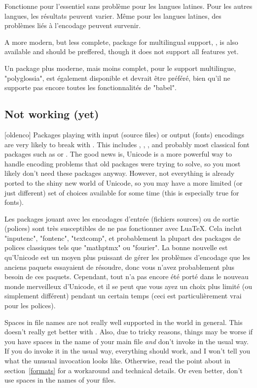 \documentclass{lltxdoc}
\begin{document}
Fonctionne pour l'essentiel sans problème pour les langues latines. Pour les autres langues, les résultats peuvent varier. Même pour les langues latines, des problèmes liés à l'encodage peuvent survenir.

A more modern, but less complete, package for multilingual support,
, is also available and should be preffered, though it does
not support all  features yet.

Un package plus moderne, mais moins complet, pour le support multilingue, "polyglossia", est également disponible et devrait être préféré, bien qu'il ne supporte pas encore toutes les fonctionnalités de "babel".

\subsection{Not working (yet)}\label{notworking}

[oldenco] Packages playing with input (source files) or
output (fonts) encodings are very likely to break with \luatex. This includes
, , , and probably most classical font
packages such as  or . The good news
is, Unicode is a more powerful way to handle encoding problems that old
packages were trying to solve, so you most likely don't need these packages
anyway. However, not everything is already ported to the shiny new world of
Unicode, so you may have a more limited (or just different) set of choices
available for some time (this is especially true for fonts).

Les packages jouant avec les encodages d'entrée (fichiers sources) ou de sortie (polices) sont très susceptibles de ne pas fonctionner avec LuaTeX. Cela inclut "inputenc", "fontenc", "textcomp", et probablement la plupart des packages de polices classiques tels que "mathptmx" ou "fourier". La bonne nouvelle est qu'Unicode est un moyen plus puissant de gérer les problèmes d'encodage que les anciens paquets essayaient de résoudre, donc vous n'avez probablement plus besoin de ces paquets. Cependant, tout n'a pas encore été porté dans le nouveau monde merveilleux d'Unicode, et il se peut que vous ayez un choix plus limité (ou simplement différent) pendant un certain temps (ceci est particulièrement vrai pour les polices).

 Spaces in file names are not really well supported in the \tex
world in general. This doesn't really get better with \luatex. Also, due to
tricky reasons, things may be worse if you have spaces in the name of your main
\tex file \emph{and} don't invoke \luatex in the usual way. If you do
invoke it in the usual way, everything should work, and I won't tell you what
the unusual invocation looks like. Otherwise, read the point about
 in section~\ref{formats} for a workaround and technical
details. Or even better, don't use spaces in the names of your \tex files.
\end{document}
